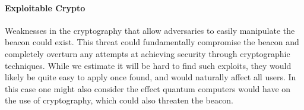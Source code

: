 \paragraph{Exploitable Crypto} Weaknesses in the cryptography that allow adversaries to easily manipulate the beacon could exist. This threat could fundamentally compromise the beacon and completely overturn any attempts at achieving security through cryptographic techniques. While we estimate it will be hard to find such exploits, they would likely be quite easy to apply once found, and would naturally affect all users. In this case one might also consider the effect quantum computers would have on the use of cryptography, which could also threaten the beacon.

